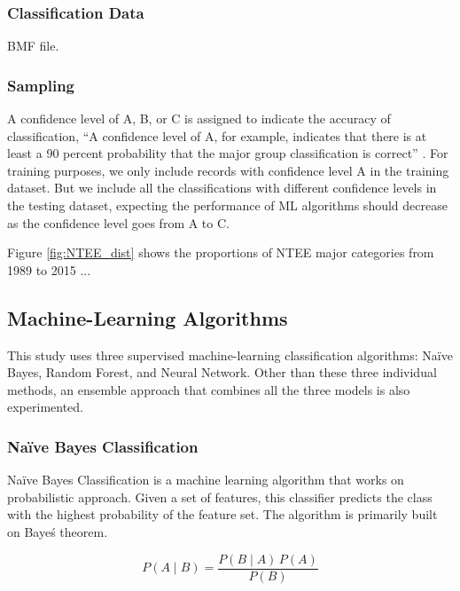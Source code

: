 \documentclass[12pt]{article}
\begin{document}
\subsubsection{Classification Data}
BMF file. 

\subsubsection{Sampling}
A confidence level of A, B, or C is assigned to indicate the accuracy of classification, ``A confidence level of A, for example, indicates that there is at least a 90 percent probability that the major group classification is correct'' \parencite[16]{NationalCenterforCharitableStatisticsGuideUsingNCCS2006}. For training purposes, we only include records with confidence level A in the training dataset. But we include all the classifications with different confidence levels in the testing dataset, expecting the performance of ML algorithms should decrease as the confidence level goes from A to C.


Figure \ref{fig:NTEE_dist} shows the proportions of NTEE major categories from 1989 to 2015 ... 

\subsection{Machine-Learning Algorithms}

This study uses three supervised machine-learning classification algorithms: Na\"ive Bayes, Random Forest, and Neural Network. Other than these three individual methods, an ensemble approach that combines all the three models is also experimented. 

\subsubsection{Na\"ive Bayes Classification}

Na\"ive Bayes Classification is a machine learning algorithm that works on probabilistic approach. Given a set of features, this classifier predicts the class with the highest probability of the feature set. The algorithm is primarily built on Baye\'s theorem.

$$ P(A \mid B) = \frac{P(B \mid A) \, P(A)}{P(B)} $$
\end{document}
